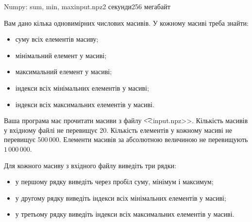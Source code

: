 \begin{problem}{Numpy: sum, min, max}{input.npz}{}{2 секунди}{256 мегабайт}

Вам дано кілька одновимірних числових масивів. У кожному масиві треба знайти:
\begin{itemize} 
\item суму всіх елементів масиву;
\item мінімальний елемент у масиві;
\item максимальний елемент у масиві;
\item індекси всіх мінімальних елементів у масиві;
\item індекси всіх максимальних елементів у масиві.
\end{itemize}

\InputFile
Ваша програма має прочитати масиви з файлу {\t {<<input.npz>>}}.
Кількість масивів у вхідному файлі не перевищує 20.
Кількість елементів у кожному масиві не перевищує $500\,000$.
Елементи масивів за абсолютною величиною не перевищують $1\,000\,000$.

\OutputFile
Для кожного масиву з вхідного файлу виведіть три рядки:
\begin{itemize} 
\item у першому рядку виведіть через пробіл суму, мінімум і максимум;
\item у другому рядку виведіть індекси всіх мінімальних елементів у масиві;
\item у третьому рядку виведіть індекси всіх максимальних елементів у масиві.
\end{itemize}


\Example
\begin{example}
%
\end{example}

\end{problem}

